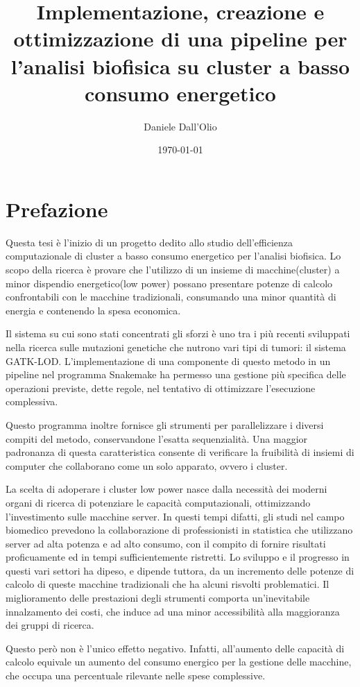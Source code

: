 \documentclass[12pt, a4paper]{report}
\title{Implementazione, creazione e ottimizzazione di una pipeline per l'analisi biofisica su cluster a basso consumo energetico}
\author{Daniele Dall'Olio}
\date{\today}
\begin{document}

\section*{Prefazione}
Questa tesi è l'inizio di un progetto dedito allo studio dell'efficienza computazionale di cluster a basso consumo energetico per l'analisi biofisica.
Lo scopo della ricerca è provare che l'utilizzo di un insieme di macchine(cluster) a minor dispendio energetico(low power) possano presentare potenze di calcolo confrontabili con le macchine tradizionali, consumando una minor quantità di energia e contenendo la spesa economica.  

Il sistema su cui sono stati concentrati gli sforzi è uno tra i più recenti sviluppati nella ricerca sulle mutazioni genetiche che nutrono vari tipi di tumori: il sistema GATK-LOD.
L'implementazione di una componente di questo metodo in un pipeline nel programma Snakemake ha permesso una gestione più specifica delle operazioni previste, dette regole, nel tentativo di ottimizzare l'esecuzione complessiva. 

Questo programma inoltre fornisce gli strumenti per parallelizzare i diversi compiti del metodo, conservandone l'esatta sequenzialità.
Una maggior padronanza di questa caratteristica consente di verificare la fruibilità di insiemi di computer che collaborano come un solo apparato, ovvero i cluster.

La scelta di adoperare i cluster low power nasce dalla necessità dei moderni organi di ricerca di potenziare le capacità computazionali, ottimizzando l'investimento sulle macchine server.
In questi tempi difatti, gli studi nel campo biomedico prevedono la collaborazione di professionisti in statistica che utilizzano server ad alta potenza e ad alto consumo, con il compito di fornire risultati proficuamente ed in tempi sufficientemente ristretti.
Lo sviluppo e il progresso in questi vari settori ha dipeso, e dipende tuttora, da un incremento delle potenze di calcolo di queste macchine tradizionali che ha alcuni risvolti problematici.
Il miglioramento delle prestazioni degli strumenti comporta un'inevitabile innalzamento dei costi, che induce ad una minor accessibilità alla maggioranza dei gruppi di ricerca.

Questo però non è l'unico effetto negativo.
Infatti, all'aumento delle capacità di calcolo equivale un aumento del consumo energico per la gestione delle macchine, che occupa una percentuale rilevante nelle spese complessive.
\end{document}
